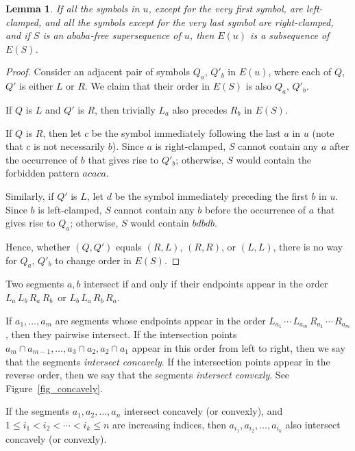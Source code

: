 \documentclass[11pt]{article}
\newtheorem{lemma}[theorem]{Lemma}
\theoremstyle{definition}
\theoremstyle{remark}
\begin{document}
\begin{lemma}\label{lemma_clamped}
If all the symbols in $u$, except for the very first symbol, are left-clamped, and all the symbols except for the very last symbol are right-clamped, and if $S$ is an $ababa$-free supersequence of $u$, then $E(u)$ is a subsequence of $E(S)$.
\end{lemma}

\begin{proof}
Consider an adjacent pair of symbols $Q_a$, $Q'_b$ in $E(u)$, where each of $Q$, $Q'$ is either $L$ or $R$. We claim that their order in $E(S)$ is also $Q_a$, $Q'_b$.

If $Q$ is $L$ and $Q'$ is $R$, then trivially $L_a$ also precedes $R_b$ in $E(S)$.

If $Q$ is $R$, then let $c$ be the symbol immediately following the last $a$ in $u$ (note that $c$ is not necessarily $b$). Since $a$ is right-clamped, $S$ cannot contain any $a$ after the occurrence of $b$ that gives rise to $Q'_b$; otherwise, $S$ would contain the forbidden pattern $acaca$.

Similarly, if $Q'$ is $L$, let $d$ be the symbol immediately preceding the first $b$ in $u$. Since $b$ is left-clamped, $S$ cannot contain any $b$ before the occurrence of $a$ that gives rise to $Q_a$; otherwise, $S$ would contain $bdbdb$.

Hence, whether $(Q,Q')$ equals $(R,L)$, $(R,R)$, or $(L,L)$, there is no way for $Q_a$, $Q'_b$ to change order in $E(S)$.
\end{proof}

Two segments $a, b$ intersect if and only if their endpoints appear in the order $L_a\, L_b\, R_a\, R_b\,$ or $L_b\, L_a\, R_b\, R_a$.

If $a_1, \ldots, a_m$ are segments whose endpoints appear in the order $L_{a_1}\, \cdots\, L_{a_m}\,\allowbreak R_{a_1}\, \cdots\, R_{a_m}$, then they pairwise intersect. If the intersection points $a_m \cap a_{m-1}, \ldots, a_3\cap a_2, a_2 \cap a_1$ appear in this order from left to right, then we say that the segments \emph{intersect concavely}. If the intersection points appear in the reverse order, then we say that the segments \emph{intersect convexly}. See Figure~\ref{fig_concavely}.

If the segments $a_1, a_2, \ldots, a_n$ intersect concavely (or convexly), and $1\le i_1 < i_2 < \cdots < i_k \le n$ are increasing indices, then $a_{i_1}, a_{i_2}, \ldots, a_{i_k}$ also intersect concavely (or convexly).
\end{document}
